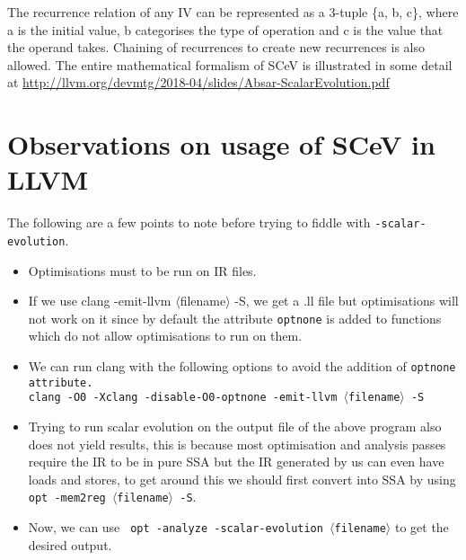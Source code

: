 \documentclass[12pt]{article}
\begin{document}
The recurrence relation of any IV can be represented as a 3-tuple \{a, b, c\}, where a is the initial value, b categorises the type of operation and c is the value that the operand takes. Chaining of recurrences to create new recurrences is also allowed. The entire mathematical formalism of SCeV is illustrated in some detail at \href{http://llvm.org/devmtg/2018-04/slides/Absar-ScalarEvolution.pdf}{http://llvm.org/devmtg/2018-04/slides/Absar-ScalarEvolution.pdf}

\section*{Observations on usage of SCeV in LLVM}

The following are a few points to note before trying to fiddle with \texttt{-scalar-evolution}.
\begin{itemize}
\item Optimisations must to be run on IR files.
\item If we use clang -emit-llvm $\langle$filename$\rangle$ -S, we get a .ll file but optimisations will not work on it since by default the attribute \texttt{optnone} is added to functions which do not allow optimisations to run on them.
\item We can run clang with the following options to avoid the addition of \texttt{optnone attribute.}\\
\texttt{clang -O0 -Xclang -disable-O0-optnone -emit-llvm $\langle$filename$\rangle$ -S}
\item Trying to run scalar evolution on the output file of the above program also does not yield results, this is because most optimisation and analysis passes require the IR to be in pure SSA but the IR generated by us can even have loads and stores, to get around this we should first convert into SSA by using \texttt{opt -mem2reg $\langle$filename$\rangle$ -S}.
\item Now, we can use \texttt{ opt -analyze -scalar-evolution $\langle$filename$\rangle$} to get the desired output.
\end{itemize}
\end{document}
